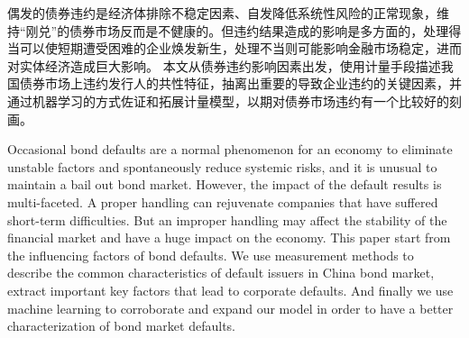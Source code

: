 \begin{cabstract}
	偶发的债券违约是经济体排除不稳定因素、自发降低系统性风险的正常现象，维持“刚兑”的债券市场反而是不健康的。但违约结果造成的影响是多方面的，处理得当可以使短期遭受困难的企业焕发新生，处理不当则可能影响金融市场稳定，进而对实体经济造成巨大影响。
	本文从债券违约影响因素出发，使用计量手段描述我国债券市场上违约发行人的共性特征，抽离出重要的导致企业违约的关键因素，并通过机器学习的方式佐证和拓展计量模型，以期对债券市场违约有一个比较好的刻画。
\end{cabstract}
\begin{eabstract}
	Occasional bond defaults are a normal phenomenon for an economy to eliminate unstable factors and spontaneously reduce systemic risks, and it is unusual to maintain a bail out bond market. However, the impact of the default results is multi-faceted. A proper handling can rejuvenate companies that have suffered short-term difficulties. But an improper handling may affect the stability of the financial market and have a huge impact on the economy.
	This paper start from the influencing factors of bond defaults. We use measurement methods to describe the common characteristics of default issuers in China bond market, extract important key factors that lead to corporate defaults. And finally we use machine learning to corroborate and expand our model in order to  have a better characterization of bond market defaults.
\end{eabstract}
